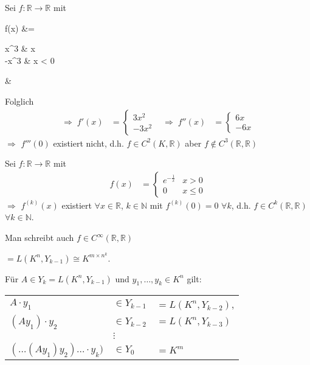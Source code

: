 \begin{example}
	Sei $f:\mathbb{R}\to\mathbb{R}$ mit \begin{flalign*}
		f(x) &= \begin{cases}
			x^3 & x \\
			-x^3 & x < 0
		\end{cases} &
	\end{flalign*}
	Folglich
	\begin{align*}
		\Rightarrow\; f'(x) &= \begin{cases}
			3x^2 \\ -3x^2
		\end{cases} & \Rightarrow \; f''(x) &= \begin{cases}
			6x \\ -6x
		\end{cases}
	\end{align*}
	$\Rightarrow$ $f'''(0)$ existiert nicht, d.h. $f\in C^2(K, \mathbb{R})$ aber $f\notin C^3(\mathbb{R},\mathbb{R})$
\end{example}

\begin{example}
	Sei $f:\mathbb{R}\to\mathbb{R}$ mit \begin{align*}
		f(x) &= \begin{cases}
			e^{-\frac{1}{x}} & x > 0 \\
			0 & x\le 0
		\end{cases}
	\end{align*}
	$\Rightarrow$ $f^{(k)}(x)$ existiert $\forall x\in\mathbb{R}$, $k\in\mathbb{N}$ mit $f^{(k)}(0) = 0$ $\forall k$, d.h. $f\in C^k(\mathbb{R},\mathbb{R})$ $\forall k\in \mathbb{N}$.
	
	Man schreibt auch $f\in C^\infty(\mathbb{R},\mathbb{R})$
\end{example}

\begin{boldenvironment}[Räume $Y_k$] $=L(K^n, Y_{k-1}) \cong K^{m\times n^k}$.
\end{boldenvironment}

Für $A\in Y_k = L(K^n, Y_{k-1})$ und $y_1, \dotsc, y_k\in K^n$ gilt:

\begin{tabularx}{\linewidth}{l@{$\,$}l@{$\,$}X}
$A\cdot y_1$ & $\in Y_{k-1}$ & $= L(K^n, Y_{k-2})$,\\
$(A y_1)\cdot y_2$ & $\in Y_{k-2}$ & $ = L(K^n, Y_{k-3})$ \\
& $\vdots$ & \\
$(\dotsc (A y_1) y_2) \dotsc \cdot y_k)$ & $ \in Y_0$ & $ = K^m$
\end{tabularx}

